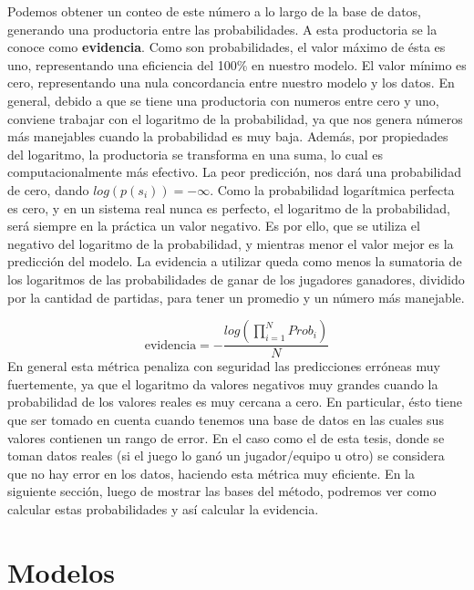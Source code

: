 \documentclass[11pt,twoside,spanish]{report} %
\begin{document}
Podemos obtener un conteo de este n\'umero a lo largo de la base de datos, generando una productoria entre las probabilidades.
A esta productoria se la conoce como \textbf{evidencia}. %
Como son probabilidades, el valor m\'aximo de \'esta es uno, representando una eficiencia del 100\% en nuestro modelo.
El valor m\'inimo es cero, representando una nula concordancia entre nuestro modelo y los datos.
En general, debido a que se tiene una productoria con numeros entre cero y uno, conviene trabajar con el logaritmo de la probabilidad, ya que nos genera n\'umeros m\'as manejables cuando la probabilidad es muy baja.
Adem\'as, por propiedades del logaritmo, la productoria se transforma en una suma, lo cual es  computacionalmente m\'as efectivo.
La peor predicci\'on, nos dar\'a una probabilidad de cero, dando $log(p(s_i))=-\infty$.
Como la probabilidad logar\'itmica perfecta es cero, y en un sistema real nunca es perfecto, el logaritmo de la probabilidad, ser\'a siempre en la pr\'actica un valor negativo.
Es por ello, que se utiliza el negativo del logaritmo de la probabilidad, y mientras menor el valor mejor es la predicci\'on del modelo.
La evidencia a utilizar queda como menos la sumatoria de los logaritmos de las probabilidades de ganar de los jugadores ganadores, dividido por la cantidad de partidas, para tener un promedio y un n\'umero m\'as manejable.


\begin{equation}
	\text{evidencia} = -\frac{log(\prod_{i=1}^{N}Prob_i)}{N}
\end{equation}
En general esta m\'etrica penaliza con seguridad las predicciones err\'oneas muy fuertemente, ya que el logaritmo da valores negativos muy grandes cuando la probabilidad de los valores reales es muy cercana a cero.
En particular, \'esto tiene que ser tomado en cuenta cuando tenemos una base de datos en las cuales sus valores contienen un rango de error.
En el caso como el de esta tesis, donde se toman datos reales (si el juego lo gan\'o un jugador/equipo u otro) se considera que no hay error en los datos, haciendo esta m\'etrica muy eficiente.
En la siguiente secci\'on, luego de mostrar las bases del m\'etodo, podremos ver como calcular estas probabilidades y as\'i calcular la evidencia.


\section{Modelos}\label{Sec:Modelos}
\end{document}
